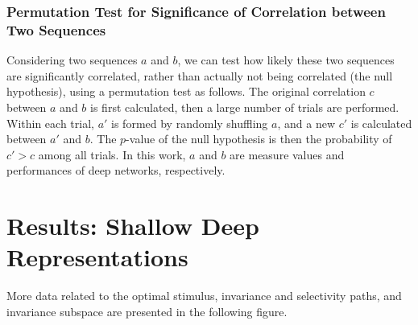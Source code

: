 \documentclass{article} %
\begin{document}
\subsubsection{Permutation Test for Significance of Correlation between Two Sequences}

Considering two sequences $a$ and $b$, we can test how likely these two sequences are significantly correlated, rather than actually not being correlated (the null hypothesis), using a permutation test as follows. The original correlation $c$ between $a$ and $b$ is first calculated, then a large number of trials are performed. Within each trial, $a'$ is formed by randomly shuffling $a$, and a new $c'$ is calculated between $a'$ and $b$. The $p$-value of the null hypothesis is then the probability of $c' > c$ among all trials.
In this work, $a$ and $b$ are measure values and performances of deep networks, respectively.



\clearpage

\section{Results: Shallow \vs Deep Representations}
\label{sec2}

More data related to the optimal stimulus, invariance and selectivity paths, and invariance subspace are presented in the following figure.
\end{document}
